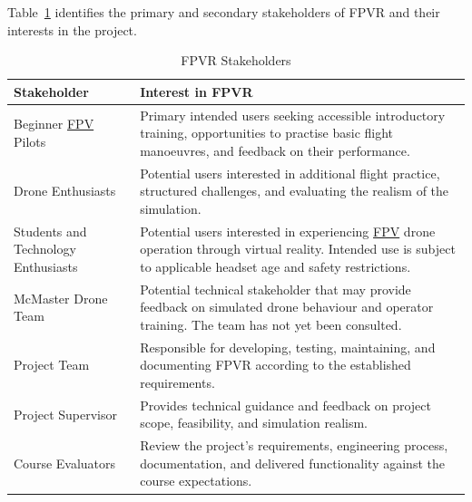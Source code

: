 \documentclass[12pt]{article}
\begin{document}
Table~\ref{tab:stakeholders} identifies the primary
and secondary stakeholders of FPVR and their interests
in the project.

\begin{table}[htbp]
\centering
\small
\caption{FPVR Stakeholders}
\label{tab:stakeholders}

\begin{tabularx}{\textwidth}{@{}p{3.4cm} X@{}}
\toprule
\textbf{Stakeholder} &
\textbf{Interest in FPVR} \\
\midrule

Beginner \hyperlink{glos:FPV}{FPV} Pilots &
Primary intended users seeking accessible introductory
training, opportunities to practise basic flight
manoeuvres, and feedback on their performance. \\

\addlinespace

Drone Enthusiasts &
Potential users interested in additional flight practice,
structured challenges, and evaluating the realism of
the simulation. \\

\addlinespace

Students and Technology Enthusiasts &
Potential users interested in experiencing \hyperlink{glos:FPV}{FPV} drone
operation through virtual reality. Intended use is
subject to applicable headset age and safety
restrictions. \\

\addlinespace

McMaster Drone Team &
Potential technical stakeholder that may provide
feedback on simulated drone behaviour
and operator training. The team has not yet been
consulted. \\

\addlinespace

Project Team &
Responsible for developing, testing, maintaining,
and documenting FPVR according to the established
requirements. \\

\addlinespace

Project Supervisor &
Provides technical guidance and feedback on project
scope, feasibility, and simulation realism. \\

\addlinespace

Course Evaluators &
Review the project's requirements, engineering
process, documentation, and delivered functionality
against the course expectations. \\


\end{tabularx}
\end{table}
\end{document}
